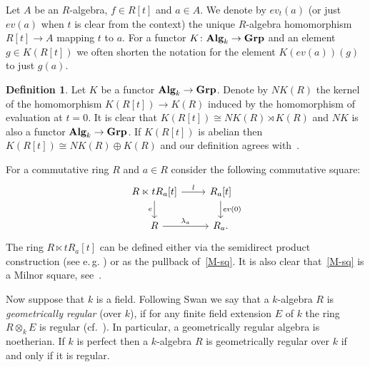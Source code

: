\documentclass[oneside, 11pt]{amsart} \pdfoutput=1
\numberwithin{equation}{section}
\theoremstyle{definition}
\newtheorem{df}[lemma]{Definition}
\newcommand{\catname}[1]{{\normalfont\textbf{#1}}} %
\begin{document}
Let $A$ be an $R$-algebra, $f\in R[t]$ and $a \in A$. We denote by $ev_t(a)$ (or just $ev(a)$ when $t$ is clear from the context) the unique $R$-algebra homomorphism $R[t] \to A$ mapping $t$ to $a$. For a functor $K \colon \catname{Alg}_k \to \catname{Grp}$ and an element $g \in K(R[t])$ we often shorten the notation for the element $K(ev(a))(g)$ to just $g(a)$.

\begin{df}\label{df:NK}
Let $K$ be a functor $\catname{Alg}_k \to \catname{Grp}$.
Denote by $NK(R)$ the kernel of the homomorphism $K(R[t]) \to K(R)$ induced by the homomorphism of evaluation at $t=0$. It is clear that $K(R[t]) \cong NK(R) \rtimes K(R)$ and $NK$ is also a functor $\catname{Alg}_k \to \catname{Grp}$. If $K(R[t])$ is abelian then $K(R[t]) \cong NK(R) \oplus K(R)$ and our definition agrees with~\cite[Def.~III.3.3]{Kbook}.
\end{df}

For a commutative ring $R$ and $a \in R$ consider the following commutative square:
  \begin{equation} \label{M-sq} \begin{tikzcd} R \ltimes t R_a[t] \ar{r}{l} \ar{d}[swap]{e} & R_a[t] \ar{d}{ev(0)} \\ R \ar{r}{\lambda_a} & R_a. \end{tikzcd}\end{equation}
  The ring $R \ltimes tR_a[t]$ can be defined either via the semidirect product construction (see e.\,g. \cite[Definition~3.2]{S15}) or as the pullback of~\eqref{M-sq}.
  It is also clear that~\eqref{M-sq} is a Milnor square, see~\cite[Example~I.2.6]{Kbook}.

Now suppose that $k$ is a field. Following Swan we say that a $k$-algebra $R$ is {\it geometrically regular} (over $k$), if for any finite field extension $E$ of $k$ the ring $R\otimes_kE$ is regular (cf.~\cite[p.~137]{Sw98}). In particular, a geometrically regular algebra is noetherian. If $k$ is perfect then a $k$-algebra $R$ is geometrically regular over $k$ if and only if it is regular.
\end{document}
